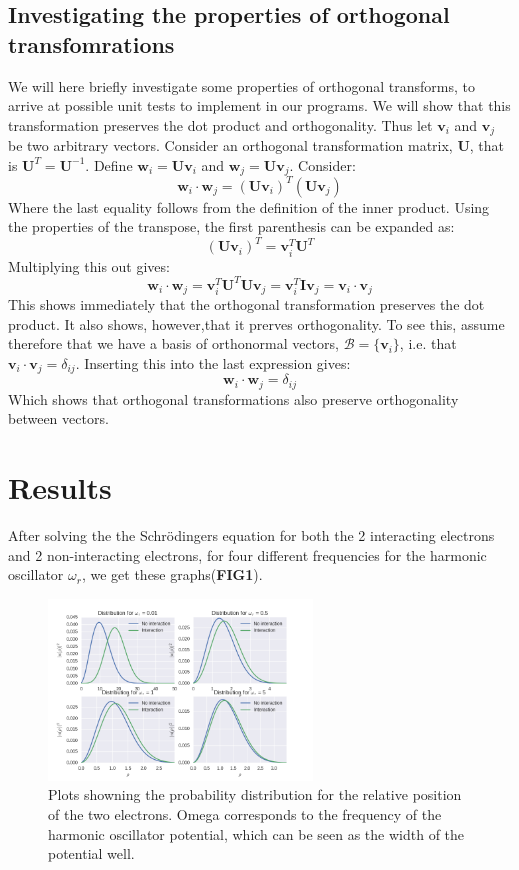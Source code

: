 \documentclass[a4paper, 10pt]{article}
\begin{document}
\subsection{Investigating the properties of orthogonal transfomrations}
We will here briefly investigate some properties of orthogonal transforms, to arrive at possible unit tests to implement in our programs. 
We will show that this transformation preserves the dot product and orthogonality. Thus let $\mathbf{v}_i$ and $\mathbf{v}_j$ be two arbitrary vectors. Consider an orthogonal transformation matrix, $\mathbf{U}$, that is $\mathbf{U}^T=\mathbf{U}^{-1}$. Define $\mathbf{w}_i=\mathbf{U}\mathbf{v}_i$ and $\mathbf{w}_j=\mathbf{U}\mathbf{v}_j$. Consider:
$$\mathbf{w}_i \cdot \mathbf{w}_j=\left(\mathbf{U}\mathbf{v}_i\right)^T\left(\mathbf{U}\mathbf{v}_j\right)$$
Where the last equality follows from the definition of the inner product. Using the properties of the transpose, the first parenthesis can be expanded as:
$$\left(\mathbf{U}\mathbf{v}_i\right)^T = \mathbf{v}_i^T\mathbf{U}^T$$
Multiplying this out gives:
$$\mathbf{w}_i\cdot \mathbf{w}_j=\mathbf{v}_i^T\mathbf{U}^T\mathbf{U}\mathbf{v}_j=
\mathbf{v}_i^T\mathbf{I}\mathbf{v}_j=\mathbf{v}_i\cdot \mathbf{v}_j$$
This shows immediately that the orthogonal transformation preserves the dot product. It also shows, however,that it prerves orthogonality. To see this, assume therefore that we have a basis of orthonormal vectors, $\mathcal{B}=\{\mathbf{v}_i\}$, i.e. that $\mathbf{v}_i\cdot \mathbf{v}_j=\delta_{ij}$. Inserting this into the last expression gives:
$$\mathbf{w}_i\cdot \mathbf{w}_j=\delta_{ij}$$
Which shows that orthogonal transformations also preserve orthogonality between vectors.



\section{Results}

After solving the the Schrödingers equation for both the 2 interacting electrons and 2 non-interacting electrons, for four different frequencies for the harmonic oscillator $\omega_r$, we get these graphs(\textbf{FIG1}).\\

\begin{figure}
\begin{center}
\includegraphics[width=70mm]{distribution_subplot.png}
\caption{Plots showning the probability distribution for the relative position of the two electrons. Omega corresponds to the frequency of the harmonic oscillator potential, which can be seen as the width of the potential well.}\label{fig:finfigur}
\end{center}
\end{figure}
\end{document}
